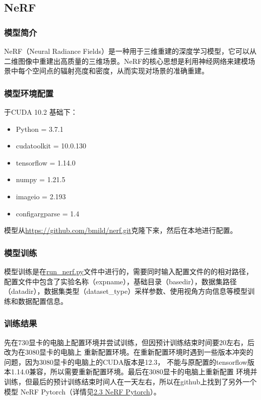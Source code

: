 \documentclass{nwputhesis}
\begin{document}
\subsection{NeRF}
\subsubsection{模型简介}
NeRF（Neural Radiance Fields）是一种用于三维重建的深度学习模型，它可以从二维图像中重建出高质量的三维场景。NeRF的核心思想是利用神经网络来建模场景中每个空间点的辐射亮度和密度，从而实现对场景的准确重建。
\subsubsection{模型环境配置}
\noindent 于CUDA 10.2 基础下：
\begin{itemize}
    \item Python = 3.7.1
    \item cudatoolkit = 10.0.130
    \item tensorflow = 1.14.0
    \item numpy = 1.21.5
    \item imageio = 2.193
    \item configargparse = 1.4
\end{itemize}
模型从\underline{https://github.com/bmild/nerf.git}克隆下来，然后在本地进行配置。

\subsubsection{模型训练}
\indent 模型训练是在\underline{run\_nerf.py}文件中进行的，需要同时输入配置文件的的相对路径，配置文件中包含了实验名称（expname），基础目录（basedir），数据集路径（datadir），数据集类型（dataset\_type）采样参数、使用视角方向信息等模型训练和数据配置信息。

\subsubsection{训练结果}
先在730显卡的电脑上配置环境并尝试训练，但因预计训练结束时间要20左右，后改为在3080显卡的电脑上
重新配置环境。在重新配置环境时遇到一些版本冲突的问题，因为3080显卡的电脑上的CUDA版本是12.3，
不能与原配置的tensorflow版本1.14.0兼容，所以需要重新配置环境。最后在3080显卡的电脑上重新配置
环境并训练，但最后的预计训练结束时间人在一天左右，所以在github上找到了另外一个模型
NeRF Pytorch（详情见\hyperref[subsection:NeRF Pytorch]{2.3 NeRF Pytorch}）。
\makespace
\end{document}
